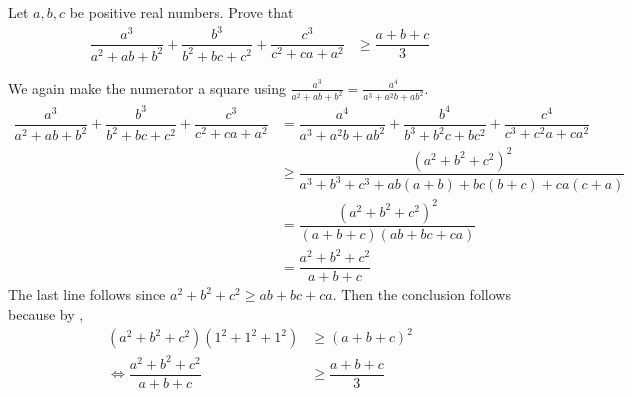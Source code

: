 \documentclass{subfile}
\begin{document}
		\begin{problem}
			Let $a,b,c$ be positive real numbers. Prove that
				\begin{align*}
					\dfrac{a^{3}}{a^{2}+ab+b^{2}}+\dfrac{b^{3}}{b^{2}+bc+c^{2}}+\dfrac{c^{3}}{c^{2}+ca+a^{2}}
						& \geq \dfrac{a+b+c}{3}
				\end{align*}

				\begin{solution}
					We again make the numerator a square using $\frac{a^{3}}{a^{2}+ab+b^{2}}=\frac{a^{4}}{a^{3}+a^{2}b+ab^{2}}$.
						\begin{align*}
							\dfrac{a^{3}}{a^{2}+ab+b^{2}}+\dfrac{b^{3}}{b^{2}+bc+c^{2}}+\dfrac{c^{3}}{c^{2}+ca+a^{2}}
								& = \dfrac{a^{4}}{a^{3}+a^{2}b+ab^{2}}+\dfrac{b^{4}}{b^{3}+b^{2}c+bc^{2}}+\dfrac{c^{4}}{c^{3}+c^{2}a+ca^{2}}\\
								& \geq \dfrac{(a^{2}+b^{2}+c^{2})^{2}}{a^{3}+b^{3}+c^{3}+ab(a+b)+bc(b+c)+ca(c+a)}\\
								& = \dfrac{(a^{2}+b^{2}+c^{2})^{2}}{(a+b+c)(ab+bc+ca)}\\
								& = \dfrac{a^{2}+b^{2}+c^{2}}{a+b+c}
						\end{align*}
					The last line follows since $a^{2}+b^{2}+c^{2}\geq ab+bc+ca$. Then the conclusion follows because by ,
						\begin{align*}
							(a^{2}+b^{2}+c^{2})(1^{2}+1^{2}+1^{2})
								& \geq (a+b+c)^{2}\\
							\iff \dfrac{a^{2}+b^{2}+c^{2}}{a+b+c}
								& \geq \dfrac{a+b+c}{3}
						\end{align*}
				\end{solution}
		\end{problem}
\end{document}
